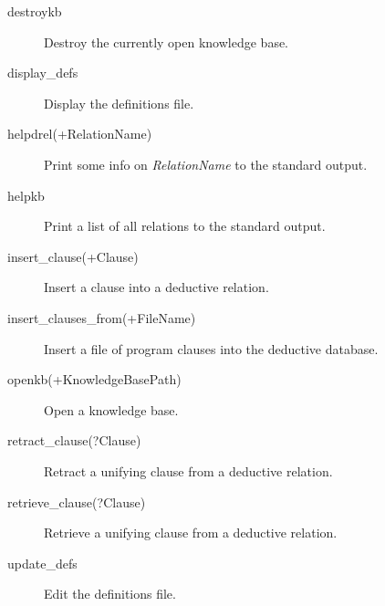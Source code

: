 \begin{description}
\item[destroykb]{Destroy the currently open knowledge base.}
\item[display_defs]{Display the definitions file.}
\item[helpdrel(+RelationName)]{Print some info on {\it RelationName} to the standard output.}
\item[helpkb]{Print a list of all relations to the standard output.}
\item[insert_clause(+Clause)]{Insert a clause into a deductive relation.}
\item[insert_clauses_from(+FileName)]{Insert a file of program clauses into the deductive database.}
\item[openkb(+KnowledgeBasePath)]{Open a knowledge base.}
\item[retract_clause(?Clause)]{Retract a unifying clause from a deductive relation.}
\item[retrieve_clause(?Clause)]{Retrieve a unifying clause from a deductive relation.}
\item[update_defs]{Edit the definitions file.}
\end{description}

